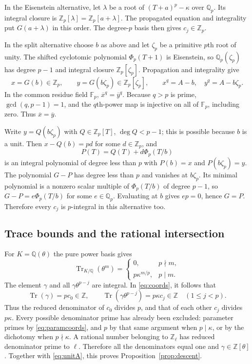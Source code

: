 \documentclass[11pt,letterpaper]{article}
\theoremstyle{remark}\newtheorem{remark}[theorem]{Remark}
\newcommand{\Q}{\mathbb Q}
\newcommand{\Z}{\mathbb Z}
\newcommand{\F}{\mathbb F}
\newcommand{\Tr}{\operatorname{Tr}}
\begin{document}
In the Eisenstein alternative, let $\lambda$ be a root of
$(T+a)^p-\kappa$ over $\Q_p$. Its integral closure is
$\Z_p[\lambda]=\Z_p[a+\lambda]$. The propagated equation and integrality
put $G(a+\lambda)$ in this order. The degree-$p$ basis then gives
$c_j\in\Z_p$.

In the split alternative choose $b$ as above and let $\zeta_p$ be a
primitive $p$th root of unity. The shifted cyclotomic polynomial
$\Phi_p(T+1)$ is Eisenstein, so $\Q_p(\zeta_p)$ has degree $p-1$ and
integral closure $\Z_p[\zeta_p]$. Propagation and integrality give
\[
  x=G(b)\in\Z_p,\qquad y=G(b\zeta_p)\in\Z_p[\zeta_p],
  \qquad x^q=A-b,\quad y^q=A-b\zeta_p.
\]
In the common residue field $\F_p$, $\overline x^q=\overline y^q$.
Because $q>p$ is prime, $\gcd(q,p-1)=1$, and the $q$th-power map is injective
on all of $\F_p$, including zero. Thus $\overline x=\overline y$.

Write $y=Q(b\zeta_p)$ with $Q\in\Z_p[T]$, $\deg Q<p-1$; this is possible
because $b$ is a unit. Then $x-Q(b)=pd$ for some $d\in\Z_p$, and
\[
                         P(T)=Q(T)+d\Phi_p(T/b)
\]
is an integral polynomial of degree less than $p$ with $P(b)=x$ and
$P(b\zeta_p)=y$. The polynomial $G-P$ has degree less than $p$ and vanishes
at $b\zeta_p$. Its minimal polynomial is a nonzero scalar multiple of
$\Phi_p(T/b)$ of degree $p-1$, so $G-P=e\Phi_p(T/b)$ for some $e\in\Q_p$.
Evaluating at $b$ gives $ep=0$, hence $G=P$. Therefore every $c_j$ is
$p$-integral in this alternative too.

\subsection{Trace bounds and the rational intersection}

For $K=\Q(\theta)$ the pure power basis gives
\[
 \Tr_{K/\Q}(\theta^m)=
 \begin{cases}0,&p\nmid m,\\p\kappa^{m/p},&p\mid m.\end{cases}
\]
The element $\gamma$ and all $\gamma\theta^{p-j}$ are integral. In
\eqref{eq:coords}, it follows that
\[
      \Tr(\gamma)=pc_0\in\Z,
 \qquad \Tr(\gamma\theta^{p-j})=p\kappa c_j\in\Z\quad(1\le j<p).
\]
Thus the reduced denominator of $c_0$ divides $p$, and that of each other
$c_j$ divides $p\kappa$. Every possible denominator prime has already been
excluded: parameter primes by \eqref{eq:paramcoords}, and $p$ by that same
argument when $p\mid\kappa$, or by the dichotomy when $p\nmid\kappa$.
A rational number belonging to $\Z_\ell$ has reduced denominator prime to
$\ell$. Therefore all the denominators equal one and
$\gamma\in\Z[\theta]$. Together with \eqref{eq:unitA}, this proves
Proposition~\ref{prop:descent}.
\end{document}
